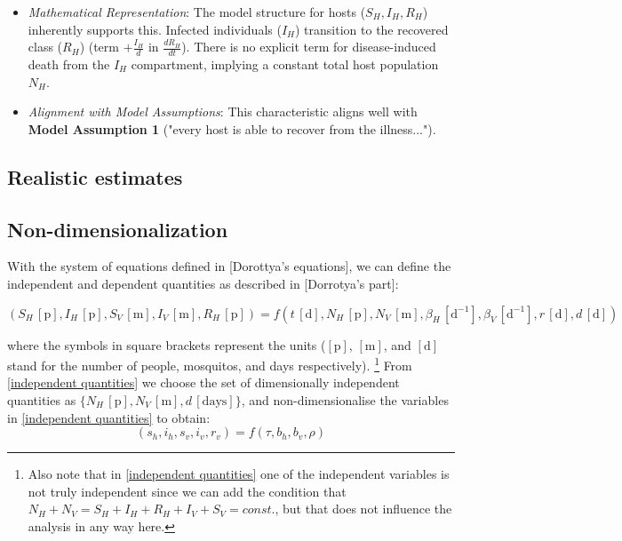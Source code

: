 \begin{itemize}
\begin{itemize}
    \begin{itemize}
        \item \textit{Mathematical Representation}: The model structure for hosts ($S_H, I_H, R_H$) inherently supports this. Infected individuals ($I_H$) transition to the recovered class ($R_H$) (term $+\frac{I_H}{d}$ in $\frac{dR_H}{dt}$). There is no explicit term for disease-induced death from the $I_H$ compartment, implying a constant total host population $N_H$.
        \item \textit{Alignment with Model Assumptions}: This characteristic aligns well with \textbf{Model Assumption 1} ("every host is able to recover from the illness...").
    \end{itemize}
    \end{itemize}
\end{itemize}

\subsection*{Realistic estimates}

\subsection*{Non-dimensionalization}

With the system of equations defined in [Dorottya's equations], we can define the independent and dependent quantities as described in [Dorrotya's part]:

\begin{equation}
(S_H \,\mathrm{[p]}, I_H \,\mathrm{[p]}, S_V \,\mathrm{[m]}, I_V \,\mathrm{[m]}, R_H \,\mathrm{[p]}) = f(t \,\mathrm{[d]}, N_H \,\mathrm{[p]}, N_V \,\mathrm{[m]}, \beta_H \, \mathrm{[d^{-1}]}, \beta_{V} \, \mathrm{[d^{-1}]}, r \, \mathrm{[d]}, d \, \mathrm{[d]}  )
\label{independent quantities}
\end{equation}

where the symbols in square brackets represent the units ($\mathrm{[p]}$,  $\mathrm{[m]}$, and $\mathrm{[d]}$ stand for the number of people, mosquitos, and days respectively). \footnote{Also note that in \cref{independent quantities} one of the independent variables is not truly independent since we can add the condition that $N_H + N_V = S_H + I_H + R_H + I_V + S_V = const.$, but that does not influence the analysis in any way here.} From \cref{independent quantities} we choose the set of dimensionally independent quantities as $\{N_H \,\mathrm{[p]}, N_V\,  \mathrm{[m]}, d \, \mathrm{[days]}\}$, and non-dimensionalise the variables in \cref{independent quantities} to obtain:
\begin{equation}
(s_h, i_h, s_v, i_v, r_v) = f(\tau, b_h, b_v, \rho)
\label{nondim quants}
\end{equation}

